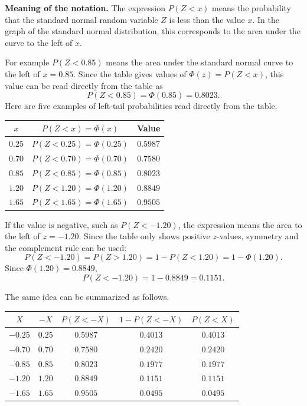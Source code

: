 	
	\noindent\textbf{Meaning of the notation.}
	The expression \(P(Z<x)\) means the probability that the standard normal random variable \(Z\) is less than the value \(x\). In the graph of the standard normal distribution, this corresponds to the area under the curve to the left of \(x\).
	
	For example $P(Z<0.85)$ means the area under the standard normal curve to the left of \(x=0.85\). Since the table gives values of \(\Phi(z)=P(Z<x)\), this value can be read directly from the table as
	\[
	P(Z<0.85)=\Phi(0.85)=0.8023.
	\]
	Here are five examples of left-tail probabilities read directly from the table.
	\begin{center}
		\begin{tabular}{c c c}
			\toprule
			\(x\) & \(P(Z<x)=\Phi(x)\) & Value \\
			\midrule
			\(0.25\) & \(P(Z<0.25)=\Phi(0.25)\) & \(0.5987\) \\
			\(0.70\) & \(P(Z<0.70)=\Phi(0.70)\) & \(0.7580\) \\
			\(0.85\) & \(P(Z<0.85)=\Phi(0.85)\) & \(0.8023\) \\
			\(1.20\) & \(P(Z<1.20)=\Phi(1.20)\) & \(0.8849\) \\
			\(1.65\) & \(P(Z<1.65)=\Phi(1.65)\) & \(0.9505\) \\
			\bottomrule
		\end{tabular}
	\end{center}
	
	If the value is negative, such as $	P(Z<-1.20)$, the expression means the area to the left of \(z=-1.20\). Since the table only shows positive \(z\)-values, symmetry and the complement rule can be used:
	\[
	P(Z<-1.20)=P(Z>1.20)=1-P(Z<1.20)=1-\Phi(1.20).
	\]
	Since \(\Phi(1.20)=0.8849\),
	\[
	P(Z<-1.20)=1-0.8849=0.1151.
	\]
	
	The same idea can be summarized as follows.
	
	\begin{center}
		\begin{tabular}{c c c c c}
			\toprule
			\(X\) & \(-X\) & \(P(Z<-X)\) & \(1-P(Z<-X)\) & \(P(Z<X)\) \\
			\midrule
			\(-0.25\) & \(0.25\) & \(0.5987\) & \(0.4013\) & \(0.4013\) \\
			\(-0.70\) & \(0.70\) & \(0.7580\) & \(0.2420\) & \(0.2420\) \\
			\(-0.85\) & \(0.85\) & \(0.8023\) & \(0.1977\) & \(0.1977\) \\
			\(-1.20\) & \(1.20\) & \(0.8849\) & \(0.1151\) & \(0.1151\) \\
			\(-1.65\) & \(1.65\) & \(0.9505\) & \(0.0495\) & \(0.0495\) \\
			\bottomrule
		\end{tabular}
	\end{center}
	
